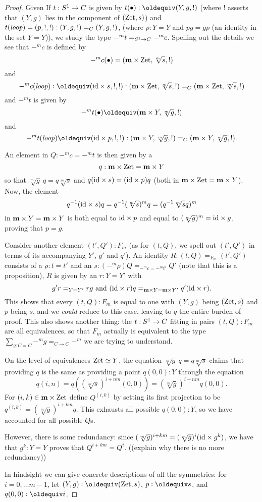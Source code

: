 \begin{proof}
Given If $t:S^1\to C$ is given by $t(\base)\defequi (Y,g,!)$ (where $!$ asserts that $(Y,g)$ lies in the component of $(\mathrm{Zet},s)$)  and $t(\mathit{loop})=(p,!,!):(Y,g,!)=_C(Y,g,!)$, (where $p:Y=Y$ and $pg=gp$ (an identity in the set $Y=Y$)), we study the type $-^mt=_{S^1\to C}-^mc$.
Spelling out the details we see that $-^mc$ is defined by 
$$-^mc(\bullet)=(\mathbf{m}\times\mathrm{Zet},\sqrt[m]s,!)$$ and 
$$-^mc(\Sloop)\defequi(\id\times s,!,!):(\bn m\times\zet,\sqrt[m]s,!)=_C(\bn m\times\zet,\sqrt[m]s,!)$$   and $-^mt$ is given by $$-^mt(\base)\oldequiv(\bn m\times Y,\sqrt[m]g,!)$$ and 
$$-^mt(\Sloop)\oldequiv(\id\times p,!,!):(\bn m\times Y,\sqrt[m]g,!)=_C(\bn m\times Y,\sqrt[m]g,!).$$

An element in $Q:-^mc=-^mt$ is then given by a 
$$q:\mathbf{m}\times\mathrm{Zet}=\mathbf{m}\times Y$$ so that $\sqrt[m]g\ q=q\sqrt[m]s$ and $q(\mathord{\mathrm{id}}\times s)=(\mathord{\mathrm{id}}\times p)q$ (both in $\mathbf{m}\times\mathrm{Zet}=\mathbf{m}\times Y$). 
Now, the element $$q^{-1}(\mathord{\mathrm{id}}\times s)q=q^{-1}(\sqrt[m]s)^mq=(q^{-1}\sqrt[m]sq)^m$$ in $\mathbf{m}\times Y=\mathbf{m}\times Y$ is both equal to $\mathord{\mathrm{id}}\times p$ and equal to $(\sqrt[m]g)^m=\mathord{\mathrm{id}}\times g$, proving that $p=g$. 


Consider another element $(t',Q'):F_m$ (as for $(t,Q)$, we spell out $(t',Q')$ in terms of its accompanying $Y'$, $g'$ and $q'$). 
An identity  $R:(t,Q)=_{F_m}(t',Q')$ consists of a $\rho:t=t'$ and an $s:(-^m\rho)Q=_{-^mc=-^mt'}Q'$ (note that this is a proposition), \ie $R$ is given by an $r:Y=Y'$ with 
$$g'r=_{Y=Y'}rg\text{ and }(\mathord{\mathrm{id}}\times r)q=_{\mathbf{m}\times Y=\mathbf{m}\times Y'}q'(\mathord{\mathrm{id}}\times r).$$  This shows that every $(t,Q):F_m$ is equal to one with $(Y,g)$ being $(\mathrm{Zet},s)$ and $p$ being $s$, and we \emph{could} reduce to this case, leaving to $q$ the entire burden of proof.  
This also shows another thing: the $t:S^1\to C$ fitting in pairs $(t,Q):F_m$ are all equivalences, so that $F_m$ actually is equivalent to the type $\sum_{g:C=C}-^mg=_{C\to C}-^m$ we are trying to understand.

 On the level of equivalences $\mathrm{Zet}\simeq Y$, the equation  $\sqrt[m]g\ q=q\sqrt[m]s$ claims that providing $q$ is the same as providing a point $q(0,0):Y$ through the equation  
$$q(i,n)=q((\sqrt[m]s)^{i+nm}(0,0))=(\sqrt[m]g)^{i+nm}q(0,0).$$  For $(i,k)\in \mathbf{m}\times\mathrm{Zet}$ define $Q^{(i,k)}$ by setting its first projection to be $q^{(i,k)}=(\sqrt[m]g)^{i+km}q$.  
This exhausts all possible $q(0,0):Y$, so we have accounted for all possible $Q$s.

However, there is some redundancy: since $(\sqrt[m]g)^{i+km}=(\sqrt[m]g)^i(\mathord{\mathrm{id}}\times g^k)$, we have that $g^k:Y=Y$ proves that $Q^{i+km}=Q^{i}$.  ((explain why there is no more redundancy)) 

In hindsight we can give concrete descriptions of all the symmetries: for $i=0,\dots m-1$, let $(Y,g)\defequi (\zet,s)$, $p\defequi s$, and $q(0,0)\defequi i$.
  \end{proof}

